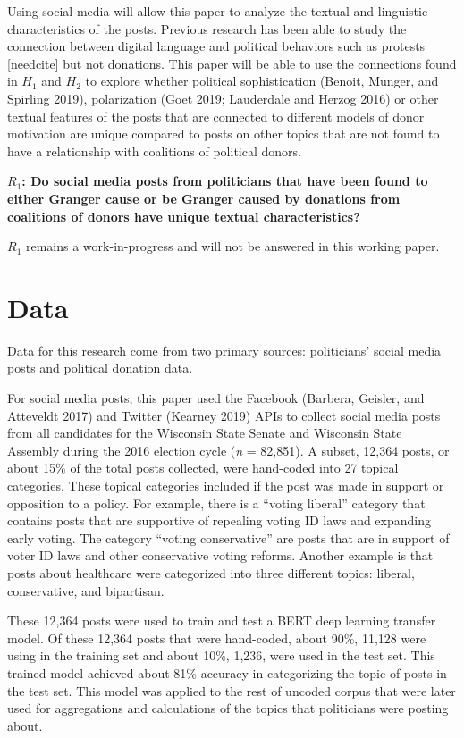 \documentclass[12pt,]{article}
\begin{document}
Using social media will allow this paper to analyze the textual and
linguistic characteristics of the posts. Previous research has been able
to study the connection between digital language and political behaviors
such as protests {[}needcite{]} but not donations. This paper will be
able to use the connections found in \(H_{1}\) and \(H_{2}\) to explore
whether political sophistication (Benoit, Munger, and Spirling 2019),
polarization (Goet 2019; Lauderdale and Herzog 2016) or other textual
features of the posts that are connected to different models of donor
motivation are unique compared to posts on other topics that are not
found to have a relationship with coalitions of political donors.

\textbf{\(R_{1}\): Do social media posts from politicians that have been
found to either Granger cause or be Granger caused by donations from
coalitions of donors have unique textual characteristics?}

\(R_{1}\) remains a work-in-progress and will not be answered in this
working paper.

\hypertarget{data}{%
\section{Data}\label{data}}

Data for this research come from two primary sources: politicians'
social media posts and political donation data.

For social media posts, this paper used the Facebook (Barbera, Geisler,
and Atteveldt 2017) and Twitter (Kearney 2019) APIs to collect social
media posts from all candidates for the Wisconsin State Senate and
Wisconsin State Assembly during the 2016 election cycle (\emph{n} =
82,851). A subset, 12,364 posts, or about 15\% of the total posts
collected, were hand-coded into 27 topical categories. These topical
categories included if the post was made in support or opposition to a
policy. For example, there is a ``voting liberal'' category that
contains posts that are supportive of repealing voting ID laws and
expanding early voting. The category ``voting conservative'' are posts
that are in support of voter ID laws and other conservative voting
reforms. Another example is that posts about healthcare were categorized
into three different topics: liberal, conservative, and bipartisan.

These 12,364 posts were used to train and test a BERT deep learning
transfer model. Of these 12,364 posts that were hand-coded, about 90\%,
11,128 were using in the training set and about 10\%, 1,236, were used
in the test set. This trained model achieved about 81\% accuracy in
categorizing the topic of posts in the test set. This model was applied
to the rest of uncoded corpus that were later used for aggregations and
calculations of the topics that politicians were posting about.
\end{document}
